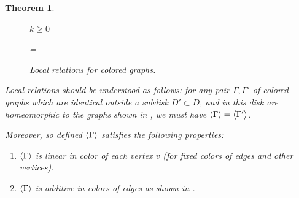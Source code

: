 \documentclass{amsart}
\newtheorem{thm}{Theorem}[section]
\DeclareMathOperator{\coev}{coev}
\newcommand{\Ga}{\Gamma}
\newcommand{\ph}{\varphi}
\begin{document}
\begin{thm}
\begin{enumerate}
\begin{figure}[ht]
\qquad $k\ge 0$\\
=
\caption{Local relations for colored graphs.
        }\label{f:local_rels1}
\end{figure}

    Local relations should be understood as follows: for any pair 
    $\Ga, \Ga'$ of colored graphs which are identical  outside a subdisk 
	$D'\subset D$, and in this disk are homeomorphic to the graphs
    shown in  ,  we must have $\<\Ga\>=\<\Ga'\>$. 
   \end{enumerate}

    Moreover, so defined $\<\Ga\>$ satisfies the following properties:
    \begin{enumerate} 
    \item $\<\Ga\>$ is linear in color of each vertex $v$ \textup{(}for 
         fixed colors of edges and other vertices\textup{)}.
    \item $\<\Ga\>$ is additive in colors of edges as shown in 
          .


\end{enumerate}
\end{thm}
\end{document}
